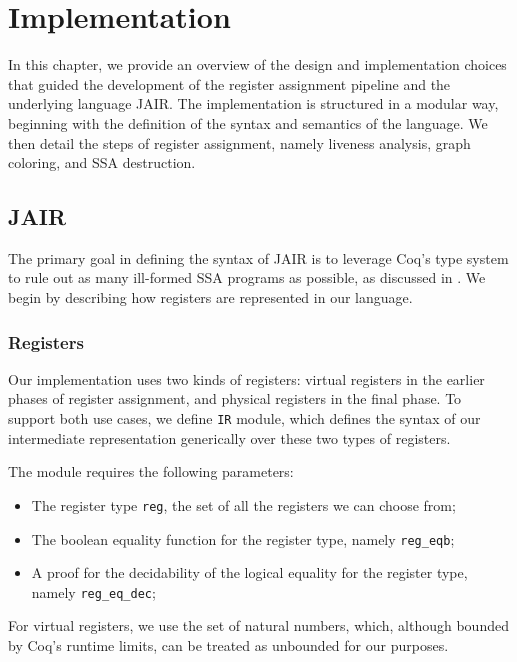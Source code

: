 
\chapter{Implementation}
\label{cha:implementation}

In this chapter, we provide an overview of the design and implementation choices that guided the development of the register assignment pipeline and the underlying language JAIR. The implementation is structured in a modular way, beginning with the definition of the syntax and semantics of the language. We then detail the steps of register assignment, namely liveness analysis, graph coloring, and SSA destruction.

\section{JAIR}
\label{sec:jair}

The primary goal in defining the syntax of JAIR is to leverage Coq’s type system to rule out as many ill-formed SSA programs as possible, as discussed in . We begin by describing how registers are represented in our language.

\subsection{Registers}

Our implementation uses two kinds of registers: virtual registers in the earlier phases of register assignment, and physical registers in the final phase. To support both use cases, we define \texttt{IR} module, which defines the syntax of our intermediate representation generically over these two types of registers.

The module requires the following parameters:
\begin{itemize}
    \item The register type \texttt{reg}, the set of all the registers we can choose from;
    \item The boolean equality function for the register type, namely \texttt{reg\_eqb};
    \item A proof for the decidability of the logical equality for the register type, namely \texttt{reg\_eq\_dec};
\end{itemize}

For virtual registers, we use the set of natural numbers, which, although bounded by Coq's runtime limits, can be treated as unbounded for our purposes.

